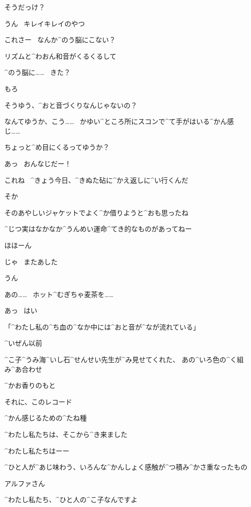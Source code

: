 \Kokone そうだっけ？

\Shiba うん
\ キレイキレイのやつ

\page
\Shiba これさー
\ なんか^{のう}{脳}にこない？

\Shiba リズムと^{わおん}{和音}がくるくるして

\Kokone ^{のう}{脳}に……
\ きた？

\Shiba もろ

\Shiba そうゆう、^{おと}{音}づくりなんじゃないの？

\Shiba なんてゆうか、こう……
\ かゆい^{ところ}{所}にスコンで^{て}{手}がはいる^{かん}{感}じ……

\Shiba ちょっと^{め}{目}にくるってゆうか？

\Kokone あっ
\ おんなじだー！

\page
\Kokone これね
\ ^{きょう}{今日}、^{きぬた}{砧}に^{かえ}{返}しに^{い}{行}くんだ

\Shiba そか

\Shiba そのあやしいジャケットでよく^{か}{借}りようと^{おも}{思}ったね

\Kokone ^{じつ}{実}はなかなか^{うんめい}{運命}^{てき}{的}なものがあってねー

\Shiba ほほーん

\page
\Shiba じゃ
\ またあした

\Kokone うん

\page
\Kokone あの……
\ ホット^{むぎちゃ}{麦茶}を……

\Person あっ
\ はい

\page[82]
\Kokone 「^{わたし}{私}の^{ち}{血}の^{なか}{中}には^{おと}{音}が^{なが}{流}れている」

\page
\Kokone ^{いぜん}{以前}

\Kokone ^{こ}{子}^{うみ}{海}^{いし}{石}^{せんせい}{先生}が^{み}{見}せてくれた、
あの^{いろ}{色}の^{く}{組}み^{あ}{合}わせ

\Kokone ^{かお}{香}りのもと

\Kokone それに、このレコード

\Kokone ^{かん}{感}じるための^{たね}{種}

\page
\Kokone ^{わたし}{私}たちは、そこから^{き}{来}ました

\Kokone ^{わたし}{私}たちはーー

\Kokone ^{ひと}{人}が^{あじ}{味}わう、いろんな^{かんしょく}{感触}が^{つ}{積}み^{かさ}{重}なったもの

\page
\Kokone アルファさん

\page
\Kokone ^{わたし}{私}たち、^{ひと}{人}の^{こ}{子}なんですよ


